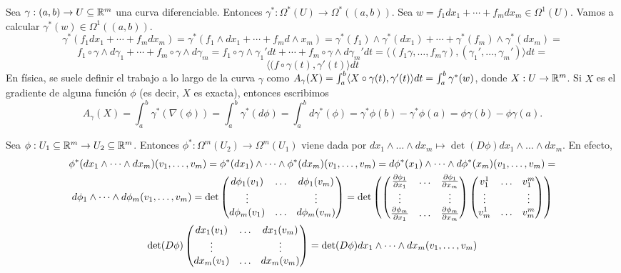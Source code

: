 \documentclass[CV.tex]{subfiles}
\begin{document}
\begin{ej}
Sea $\gamma:(a,b)\to U\subseteq\mathbb{R}^m$ una curva diferenciable. Entonces $\gamma^*:\Omega^*(U)\to\Omega^*((a,b))$. Sea $w=f_1dx_1+\cdots+f_m dx_m\in\Omega^1(U)$. Vamos a calcular $\gamma^*(w)\in\Omega^1((a,b))$.
\[
\gamma^*(f_1dx_1+\cdots+f_m dx_m)=\gamma^*(f_1\land dx_1+\cdots+f_m d\land x_m)=\gamma^*(f_1)\land\gamma^*(dx_1)+\cdots+\gamma^*(f_m)\land\gamma^*(dx_m)=
\]
\[
f_1\circ\gamma\land d\gamma_1+\cdots+f_m\circ\gamma\land d\gamma_m=f_1\circ\gamma\land \gamma_1'dt+\cdots+f_m\circ\gamma\land d\gamma_m'dt=\langle (f_1\gamma,\dots,f_m\gamma),(\gamma_1',\dots,\gamma_m')\rangle dt=
\]
\[
\langle (f\circ\gamma(t),\gamma'(t)\rangle dt
\]
En física, se suele definir el trabajo a lo largo de la curva $\gamma$ como $A_{\gamma}(X)=\int_a^b\langle{X\circ\gamma(t),\gamma'(t)}\rangle dt=\int_a^b\gamma^*(w)$, donde $X:U\to\mathbb{R}^m$. Si $X$ es el gradiente de alguna función $\phi$ (es decir, $X$ es exacta), entonces escribimos 
\[
A_{\gamma}(X)=\int_a^b\gamma^*(\nabla(\phi))=\int_a^b\gamma^*(d\phi)=\int_a^b d\gamma^*(\phi)=\gamma^*\phi(b)-\gamma^*\phi(a)=\phi\gamma(b)-\phi\gamma(a).
\]
\end{ej}
\begin{ej}
Sea $\phi:U_1\subseteq\mathbb{R}^m\to U_2\subseteq\mathbb{R}^m$. Entonces $\phi^*:\Omega^m(U_2)\to\Omega^m(U_1)$ viene dada por $dx_1\land\dots\land dx_m\mapsto \det(D\phi)dx_1\land\dots\land dx_m$. En efecto,
\begin{gather*}
\phi^*(dx_1\land\dots\land dx_m)(v_1,\dots, v_m)=\phi^*(dx_1)\land\dots\land\phi^*(dx_m)(v_1,\dots,v_m)=d\phi^*(x_1)\land\dots\land d\phi^*(x_m)(v_1,\dots, v_m)=\\
d\phi_1\land\dots\land d\phi_m(v_1,\dots, v_m)=\det\begin{pmatrix}
d\phi_1(v_1) & \dots & d\phi_1(v_m)\\
\vdots & &\vdots\\
d\phi_m(v_1) & \dots & d\phi_m(v_m)
\end{pmatrix}=\det\left(\begin{pmatrix}
\frac{\partial \phi_1}{\partial x_1} &\dots & \frac{\partial \phi_1}{\partial x_m}\\
\vdots & & \vdots\\
\frac{\partial \phi_m}{\partial x_1} & \dots & \frac{\partial \phi_m}{\partial x_m}
\end{pmatrix}\begin{pmatrix}
v_1^1 & \dots & v^m_1\\
\vdots & & \vdots\\
v_m^1 & \dots & v^m_m
\end{pmatrix}\right)\\
\det(D\phi)\begin{pmatrix}
dx_1(v_1) & \dots & dx_1(v_m)\\
\vdots & & \vdots\\
dx_m(v_1) & \dots & dx_m(v_m)
\end{pmatrix}=\det(D\phi)dx_1\land\dots\land dx_m(v_1,\dots, v_m)
\end{gather*}
\end{ej}
\end{document}
